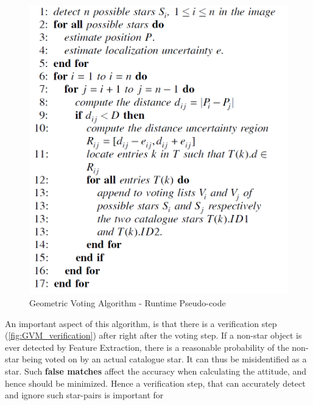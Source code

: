 \documentclass[../../main.tex]{subfiles}
\begin{document}
\begin{figure}[h!]
    \centering
    \includegraphics[scale=0.45]{Figures/GNC/GVM_Runtime.PNG}
    \caption{Geometric Voting Algorithm - Runtime Pseudo-code}
    \label{fig:GVM_runtime}
\end{figure}


An important aspect of this algorithm, is that there is a verification step (\ref{fig:GVM_verification}) after right after the voting step. 
If a non-star object is ever detected by Feature Extraction, there is a reasonable probability of the non-star being voted on by an actual catalogue star. It can thus be misidentified as a star. Such \textbf{false matches} affect the accuracy when calculating the attitude, and hence should be minimized. Hence a verification step, that can accurately detect and ignore such star-pairs is important for 
\end{document}
